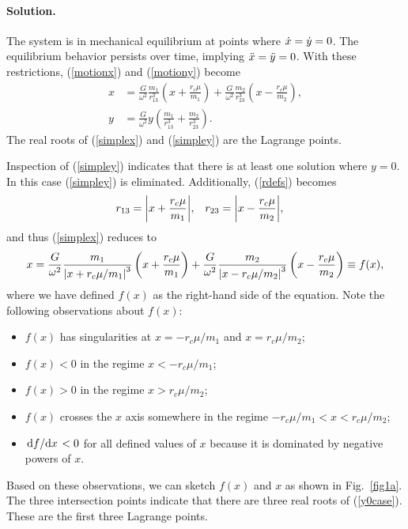 \documentclass[11pt]{article}
\newcommand{\refeq}[1]{(\ref{#1})}
\newenvironment{solution}
{
    \paragraph{Solution.}
    \ignorespaces
}
{
    \bigskip
}
\begin{document}
\begin{solution}
	The system is in mechanical equilibrium at points where $\dot{x} = \dot{y} = 0$.  The equilibrium behavior persists over time, implying $\ddot{x} = \ddot{y} = 0$.  With these restrictions, \refeq{motionx} and \refeq{motiony} become
	\begin{align}
		x &= \frac{G}{\omega^2} \frac{m_1}{r_{13}^3} \left( x + \frac{r_c \mu}{m_1} \right) + \frac{G}{\omega^2} \frac{m_2}{r_{23}^3} \left( x - \frac{r_c \mu}{m_2} \right), \label{simplex} \\
		y &= \frac{G}{\omega^2} y \left( \frac{m_1}{r_{13}^3} + \frac{m_2}{r_{23}^3} \right).\label{simpley}
	\end{align}
	The real roots of \refeq{simplex} and \refeq{simpley} are the Lagrange points.
	
	Inspection of \refeq{simpley} indicates that there is at least one solution where $y = 0$.  In this case \refeq{simpley} is eliminated.  Additionally, \refeq{rdefs} becomes
	\begin{align}
		r_{13} &= \qty|x + \frac{r_c \mu}{m_1}|, &
		r_{23} &= \qty|x - \frac{r_c \mu}{m_2}|,
	\end{align}
	and thus \refeq{simplex} reduces to
	\begin{equation}
		x = \frac{G}{\omega^2} \frac{m_1}{\qty|x + r_c \mu / m_1|^3} \left( x + \frac{r_c \mu}{m_1} \right) + \frac{G}{\omega^2} \frac{m_2}{\qty|x - r_c \mu / m_2|^3} \left( x - \frac{r_c \mu}{m_2} \right) \equiv f(x), \label{y0case}
	\end{equation}
	where we have defined $f(x)$ as the right-hand side of the equation.  Note the following observations about $f(x)$:
	\begin{itemize}
		\item $f(x)$ has singularities at $x = - r_c \mu / m_1$ and $x = r_c \mu / m_2$;
		\item $f(x) < 0$ in the regime $x < - r_c \mu / m_1$;
		\item $f(x) > 0$ in the regime $x > r_c \mu / m_2$;
		\item $f(x)$ crosses the $x$ axis somewhere in the regime $- r_c \mu / m_1 < x < r_c \mu / m_2$;
		\item $\dv*{f}{x} < 0$ for all defined values of $x$ because it is dominated by negative powers of $x$.
	\end{itemize}
	Based on these observations, we can sketch $f(x)$ and $x$ as shown in Fig.~\ref{fig1a}.  The three intersection points indicate that there are three real roots of \refeq{y0case}.  These are the first three Lagrange points.
	

\end{solution}
\end{document}
